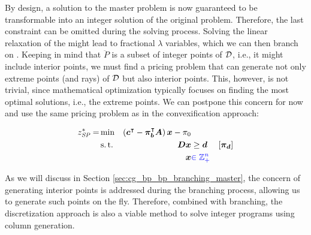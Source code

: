 By design, a solution to the master problem is now guaranteed to be transformable into an integer solution of the original problem. Therefore, the last constraint can be omitted during the solving process. Solving the linear relaxation of the \RMP{} might lead to fractional $\lambda$ variables, which we can then branch on \cite{thebook}. Keeping in mind that $\ddot{P}$ is a subset of integer points of $\mathcal{D}$, i.e., it might include interior points, we must find a pricing problem that can generate not only extreme points (and rays) of $\mathcal{D}$ but also interior points. This, however, is not trivial, since mathematical optimization typically focuses on finding the most optimal solutions, i.e., the extreme points. We can postpone this concern for now and use the same pricing problem as in the convexification approach:

\begin{equation}
\begin{aligned}
z^*_\SP{} = &\min & \left( \vec{c}\transpose - \vec{\pi}_\vec{b}\transpose \mat{A} \right) \vec{x} - \pi_0 & & \\
&\st & \mat{D} \vec{x} & \geq \vec{d} & \left[\vec{\pi}_\vec{d}\right] \\
&& \vec{x} & {\color{blue} \in \mathbb{Z}_+^n}
\end{aligned}
\end{equation}

As we will discuss in Section \ref{sec:cg_bp_bp_branching_master}, the concern of generating interior points is addressed during the branching process, allowing us to generate such points on the fly. Therefore, combined with branching, the discretization approach is also a viable method to solve integer programs using column generation.

